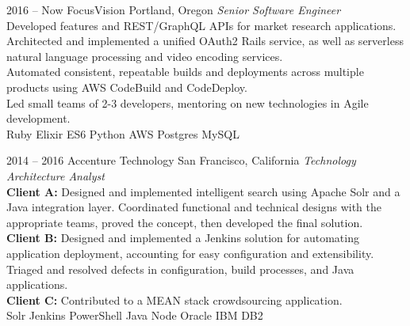 \documentclass[]{friggeri-cv} %
\begin{document}
\begin{entrylist}


\entry
{2016 -- Now}
{FocusVision}
{Portland, Oregon}
{\emph{Senior Software Engineer} \\
    Developed features and REST/GraphQL APIs for market research applications.
    \\
    Architected and implemented a unified OAuth2 Rails service, as well as serverless natural language processing and video encoding services.
    \\
    Automated consistent, repeatable builds and deployments across multiple products using AWS CodeBuild and CodeDeploy.
    \\
    Led small teams of 2-3 developers, mentoring on new technologies in Agile development.
    \\
Ruby \mydot Elixir \mydot ES6 \mydot Python \mydot AWS \mydot Postgres \mydot MySQL}

\entry
{2014 -- 2016}
{Accenture Technology}
{San Francisco, California}
{\emph{Technology Architecture Analyst} \\
    \textbf{Client A:} Designed and implemented intelligent search using Apache Solr and a Java integration layer. Coordinated functional and technical designs with the appropriate teams, proved the concept, then developed the final solution.
    \\
    \textbf{Client B:} Designed and implemented a Jenkins solution for automating application deployment, accounting for easy configuration and extensibility. Triaged and resolved defects in configuration, build processes, and Java applications.
    \\
    \textbf{Client C:} Contributed to a MEAN stack crowdsourcing application. \\
Solr \mydot Jenkins \mydot PowerShell \mydot Java \mydot Node \mydot Oracle \mydot IBM DB2}


\end{entrylist}
\end{document}
